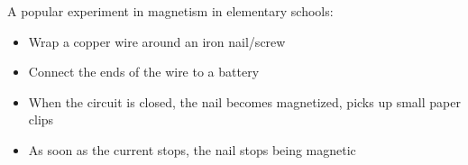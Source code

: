 %        
%
%        
%
%
%
%
%  
%
%  
%
%
%
%
%
%
A popular experiment in magnetism in elementary schools:
\begin{itemize}
\item Wrap a copper wire around an iron nail/screw
\item Connect the ends of the wire to a battery
\item When the circuit is closed, the nail becomes magnetized, picks up
  small paper clips
\item As soon as the current stops, the nail stops being magnetic
\end{itemize}
\begin{center}
\end{center}




